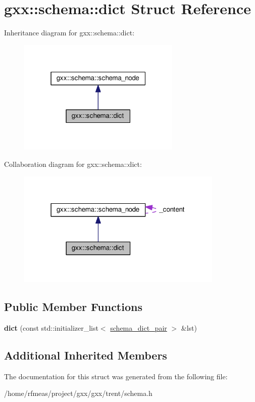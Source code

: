 \hypertarget{structgxx_1_1schema_1_1dict}{}\section{gxx\+:\+:schema\+:\+:dict Struct Reference}
\label{structgxx_1_1schema_1_1dict}


Inheritance diagram for gxx\+:\+:schema\+:\+:dict\+:
\nopagebreak
\begin{figure}[H]
\begin{center}
\leavevmode
\includegraphics[width=220pt]{structgxx_1_1schema_1_1dict__inherit__graph}
\end{center}
\end{figure}


Collaboration diagram for gxx\+:\+:schema\+:\+:dict\+:
\nopagebreak
\begin{figure}[H]
\begin{center}
\leavevmode
\includegraphics[width=279pt]{structgxx_1_1schema_1_1dict__coll__graph}
\end{center}
\end{figure}
\subsection*{Public Member Functions}
\begin{DoxyCompactItemize}
\item 
{\bfseries dict} (const std\+::initializer\+\_\+list$<$ \hyperlink{structgxx_1_1schema_1_1schema__dict__pair}{schema\+\_\+dict\+\_\+pair} $>$ \&lst)\hypertarget{structgxx_1_1schema_1_1dict_adde30152a288ea3a1f60426caa50f27b}{}\label{structgxx_1_1schema_1_1dict_adde30152a288ea3a1f60426caa50f27b}

\end{DoxyCompactItemize}
\subsection*{Additional Inherited Members}


The documentation for this struct was generated from the following file\+:\begin{DoxyCompactItemize}
\item 
/home/rfmeas/project/gxx/gxx/trent/schema.\+h\end{DoxyCompactItemize}

